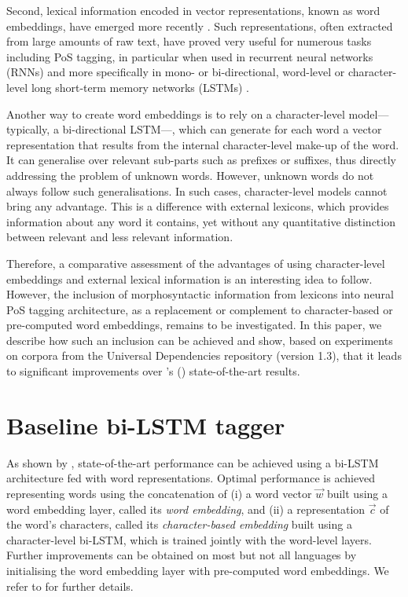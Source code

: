 \documentclass[11pt,letterpaper]{article}
\begin{document}
Second, lexical information encoded in vector representations, known as word embeddings, have emerged more
recently \cite{bengio03,collobert08,chrupala13,ling15,ballesteros15,muller15}. Such representations, often
extracted from large amounts of raw text, have proved very useful for numerous tasks including PoS tagging, in
particular when used in recurrent neural networks (RNNs) and more specifically in mono- or bi-directional, word-level or
character-level long short-term memory networks (LSTMs) \cite{hochreiter97,ling15,ballesteros15,plank16}.

Another way to create word embeddings is to rely on a character-level model---typically, a bi-directional LSTM---, which
can generate for each word a vector representation that results from the internal character-level make-up of the
word. It can generalise over relevant sub-parts such as prefixes or suffixes, thus directly addressing the problem of
unknown words. However, unknown words do not always follow such generalisations. In such cases, character-level models
cannot bring any advantage. This is a difference with external lexicons, which provides information about any
word it contains, yet without any quantitative distinction between relevant and less relevant information.

Therefore, a comparative assessment of the advantages of using character-level embeddings and external lexical
information is an interesting idea to follow. However, the inclusion of morphosyntactic information from lexicons
into neural PoS tagging architecture, as a replacement or complement to character-based or pre-computed word embeddings,
remains to be investigated. In this paper, we describe how such an inclusion can be achieved and show, based on
experiments on corpora from the Universal Dependencies repository (version 1.3), that it leads to significant
improvements over \citeauthor{plank16}'s (\citeyear{plank16}) state-of-the-art results.


\section{Baseline bi-LSTM tagger}
\label{sec:baselinearchitecture}
As shown by \citet{plank16}, state-of-the-art performance can be achieved using a bi-LSTM architecture fed with word
representations. Optimal performance is achieved representing words using the concatenation of (i) a word vector
$\vec{w}$ built using a word embedding layer, called its {\em word embedding}, and (ii) a representation $\vec{c}$ of
the word's characters, called its {\em character-based embedding} built using a character-level bi-LSTM, which is
trained jointly with the word-level layers. Further improvements can be obtained on most but not all languages by
initialising the word embedding layer with pre-computed word embeddings. We refer to \citet{plank16} for further details.
\end{document}
